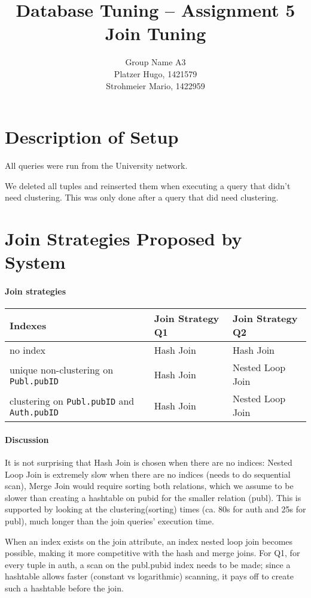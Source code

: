\documentclass[11pt]{scrartcl}
\title{
  \textbf{\large Database Tuning -- Assignment 5}\\
  Join Tuning
}
\author{
 Group Name A3\\
 \large Platzer Hugo, 1421579 \\
 \large Strohmeier Mario, 1422959
}
\begin{document}
\maketitle

\section{Description of Setup}
All queries were run from the University network.

We deleted all tuples and reinserted them when executing a query that didn't need clustering. This was only done after a query that did need clustering. 

\section{Join Strategies Proposed by System}

\paragraph{Join strategies}

\begin{flushleft}
\begin{tabular}{l|l|l}
  Indexes & Join Strategy Q1 & Join Strategy Q2\\
  \hline
  no index & Hash Join & Hash Join  \\
  unique non-clustering on {\tt Publ.pubID} & Hash Join  & Nested Loop Join \\
  clustering on {\tt Publ.pubID} and {\tt Auth.pubID} & Hash Join & Nested Loop Join \\
\end{tabular}
\end{flushleft}

\paragraph{Discussion}
It is not surprising that Hash Join is chosen when there are no indices: Nested Loop Join
is extremely slow when there are no indices (needs to do sequential scan), Merge Join would
require sorting both relations, which we assume to be slower than creating a hashtable on pubid
for the smaller relation (publ). This is supported by looking at the clustering(sorting) times
(ca. 80s for auth and 25s for publ), much longer than the join queries' execution time.

When an index exists on the join attribute, an index nested loop join becomes possible, making
it more competitive with the hash and merge joins. For Q1, for every tuple in auth, a scan on
the publ.pubid index needs to be made; since a hashtable allows faster (constant vs logarithmic) scanning,
it pays off to create such a hashtable before the join.
\end{document}
